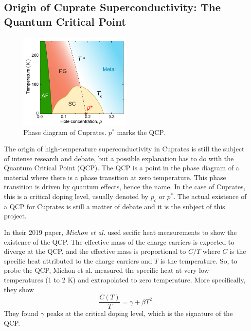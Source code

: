 \subsection{Origin of Cuprate Superconductivity: The Quantum Critical Point}
\begin{figure}
    \centering
    \includegraphics[width=0.5\textwidth]{figures/phase_diagram}
    \caption{Phase diagram of Cuprates. $p^*$ marks the QCP.}
    \label{fig:phase_diagram}
\end{figure}

The origin of high-temperature superconductivity in Cuprates is still the subject of intense
research and debate, but a possible explanation has to do with the Quantum Critical Point (QCP).
The QCP is a point in the phase diagram of a material where there is a phase transition at zero
temperature. This phase transition is driven by quantum effects, hence the name. In the case of
Cuprates, this is a critical doping level, usually denoted by $p_c$ or $p^*$. The actual existence
of a QCP for Cuprates is still a matter of debate and it is the subject of this project.

In their 2019 paper, \textit{Michon et al.} \cite{michon2019} used secific heat measurements to
show the existence of the QCP. The effective mass of the charge carriers is expected to diverge at
the QCP, and the effective mass is proportional to $C/T$ where $C$ is the specific heat attributed
to the charge carriers and $T$ is the temperature. So, to probe the QCP, Michon et al. measured
the specific heat at very low temperatures (1 to 2 K) and extrapolated to zero temperature. More
specifically, they show
\begin{equation}
    \frac{C(T)}{T} = \gamma + \beta T^2.
\end{equation}
They found $\gamma$ peaks at the critical doping level, which is the signature of the QCP.
